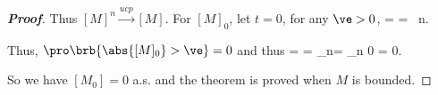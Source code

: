 \begin{proof}[\bf Proof]


Thus $[M]^n \xrightarrow{ucp} [M]$. For $[M]_0$, let $t=0$, for any $\ve>0$,
\be
\pro{} =\pro{} = \pro{} \ n\to \infty.
\ee

Thus, $\pro\brb{\abs{[M]_0}>\ve}= 0$ and thus
\be
\pro{} = \pro{} = \pro{} \leq \sum_{n\in \N}\pro{}= \sum_{n\in \N} 0 = 0.
\ee

So we have $[M_0] = 0$ a.s. and the theorem is proved when $M$ is bounded.



\end{proof}
